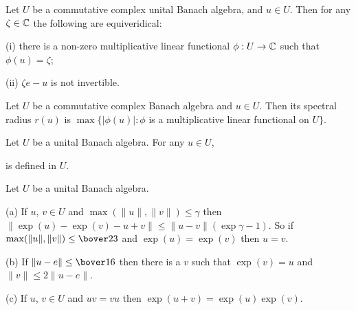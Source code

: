  Let $U$ be a commutative complex unital Banach
algebra, and $u\in U$.   Then for any $\zeta\in\Bbb C$ the following are
equiveridical:

(i) there is a non-zero multiplicative linear functional
$\phi:U\to\Bbb C$ such that $\phi(u)=\zeta$;

(ii) $\zeta e-u$ is not invertible.


 Let $U$ be a commutative complex Banach
algebra and $u\in U$.   Then its spectral radius $r(u)$ is
$\max\{|\phi(u)|:\phi$ is a multiplicative linear functional on $U\}$.

 Let $U$ be a unital Banach algebra.
For any $u\in U$,


\noindent is defined in $U$.   

 Let $U$ be a unital Banach algebra.

(a) If $u$, $v\in U$ and $\max(\|u\|,\|v\|)\le\gamma$ then
$\|\exp(u)-\exp(v)-u+v\|\le\|u-v\|(\exp\gamma-1)$.   So if
$\max(\|u\|,\|v\|)\le\bover23$ and $\exp(u)=\exp(v)$ then $u=v$.

(b) If $\|u-e\|\le\bover16$ then there is a $v$ such that $\exp(v)=u$
and $\|v\|\le 2\|u-e\|$.

(c) If $u$, $v\in U$ and $uv=vu$ then $\exp(u+v)=\exp(u)\exp(v)$.


